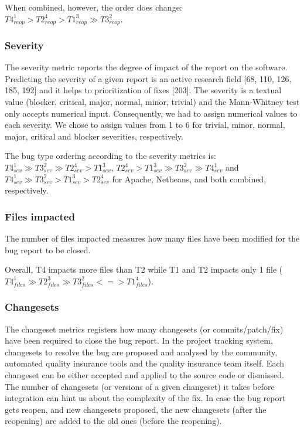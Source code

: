 \documentclass[12pt]{report}
\begin{document}
When combined, however, the order does change:
\(T4_{reop}^1 > T2_{reop}^4 > T1_{reop}^3 \gg T3_{reop}^2\).

\subsubsection{Severity}\label{severity}

The severity metric reports the degree of impact of the report on the
software. Predicting the severity of a given report is an active
research field {[}68, 110, 126, 185, 192{]} and it helps to
prioritization of fixes {[}203{]}. The severity is a textual value
(blocker, critical, major, normal, minor, trivial) and the Mann-Whitney
test only accepts numerical input. Consequently, we had to assign
numerical values to each severity. We chose to assign values from 1 to 6
for trivial, minor, normal, major, critical and blocker severities,
respectively.

The bug type ordering according to the severity metrics is:
\(T4_{sev}^1 \gg T3_{sev}^2 \gg T2_{sev}^4 > T1_{sev}^3\),
\(T2_{sev}^4 > T1_{sev}^3 \gg T3_{sev}^2 \gg T4_{sev}^1\) and
\(T4_{sev}^1 \gg T3_{sev}^2 > T1_{sev}^3 > T2_{sev}^4\) for Apache,
Netbeans, and both combined, respectively.

\subsubsection{Files impacted}\label{files-impacted}

The number of files impacted measures how many files have been modified
for the bug report to be closed.

Overall, T4 impacts more files than T2 while T1 and T2 impacts only 1
file
(\(T4_{files}^1 \gg T2_{files}^3 \gg T3_{files}^2 < = > T1_{files}^4\)).

\subsubsection{Changesets}\label{changesets}

The changeset metrics registers how many changesets (or
commits/patch/fix) have been required to close the bug report. In the
project tracking system, changesets to resolve the bug are proposed and
analysed by the community, automated quality insurance tools and the
quality insurance team itself. Each changeset can be either accepted and
applied to the source code or dismissed. The number of changesets (or
versions of a given changeset) it takes before integration can hint us
about the complexity of the fix. In case the bug report gets reopen, and
new changesets proposed, the new changesets (after the reopening) are
added to the old ones (before the reopening).
\end{document}
